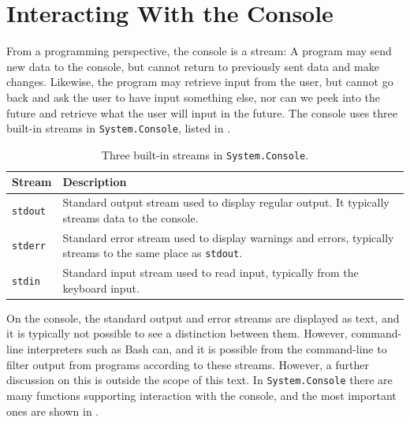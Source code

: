 \documentclass[fsharpNotes.tex]{subfiles}
\begin{document}
\section{Interacting With the Console}
From a programming perspective, the console is a stream: A program may send new data to the console, but cannot return to previously sent data and make changes. Likewise, the program may retrieve input from the user, but cannot go back and ask the user to have input something else, nor can we peek into the future and retrieve what the user will input in the future. The console uses three built-in streams in \lstinline!System.Console!, listed in .%
%
%
%
\begin{table}
  \begin{center}
    \begin{tabularx}{\linewidth}{|l|X|}
      \hline
      \rowcolor{headerRowColor} Stream & Description\\
      \hline
      \lstinline{stdout} & Standard output stream used to display regular output. It typically streams data to the console.\\
      \hline
      \lstinline{stderr} & Standard error stream used to display warnings and errors, typically streams to the same place as \lstinline{stdout}.\\
      \hline
      \lstinline{stdin} & Standard input stream used to read input, typically from the keyboard input.\\
      \hline
    \end{tabularx}
  \end{center}
  \caption{Three built-in streams in \lstinline{System.Console}.}
  \label{tab:builtinStreams}
\end{table}
On the console, the standard output and error streams are displayed as text, and it is typically not possible to see a distinction between them. However, command-line interpreters such as Bash can, and it is possible from the command-line to filter output from programs according to these streams. However, a further discussion on this is outside the scope of this text. In \lstinline!System.Console! there are many functions supporting interaction with the console, and the most important ones are shown in .%
%
%
%
%
\end{document}
